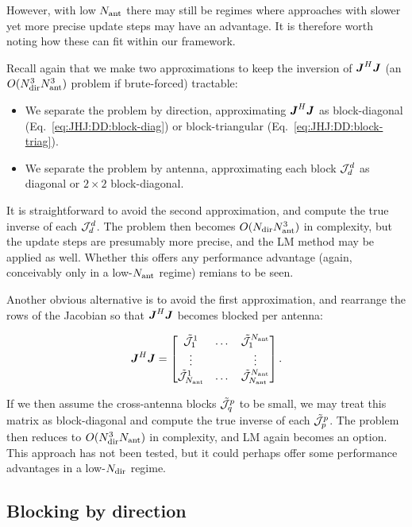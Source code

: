 \documentclass[useAMS,usenatbib]{mn2e}
\newcommand{\mat}[1]{{\bmath{#1}}}
\newcommand{\JJ}{\mat{J}} %
\newcommand{\JHJ}{\JJ^H\JJ} %
\begin{document}
However, with low $N_\mathrm{ant}$ there may still be regimes where approaches with slower yet more precise update steps may have an advantage. 
It is therefore worth noting how these can fit within our framework. 

Recall again that we make two approximations to keep the inversion of $\JHJ$ (an $O(N_\mathrm{dir}^3N_\mathrm{ant}^3)$ problem if brute-forced) tractable:

\begin{itemize}
\item We separate the problem by direction, approximating $\JHJ$ as block-diagonal (Eq.~\ref{eq:JHJ:DD:block-diag}) or block-triangular
(Eq.~\ref{eq:JHJ:DD:block-triag}).
\item We separate the problem by antenna, approximating each block $\mathcal{J}^d_d$ as diagonal or $2\times2$ block-diagonal. 
\end{itemize} 

It is straightforward to avoid the second approximation, and compute the true inverse of each $\mathcal{J}^d_d$. The problem then becomes
$O(N_\mathrm{dir}N_\mathrm{ant}^3)$ in complexity, but the update steps are presumably more precise, and the LM method may be applied as well. Whether
this offers any performance advantage (again, conceivably only in a low-$N_\mathrm{ant}$ regime) remians to be seen.

Another obvious alternative is to avoid the first approximation, and rearrange the rows of the Jacobian so that $\JHJ$ becomes blocked per antenna:

\newcommand{\JJX}{\tilde{\JJJ}}
\begin{equation}
\label{eq:JHJ:DD:blocked-ant}
\JHJ = \Matrix{ccc}{\JJX^1_1 & \dots & \JJX^{\Na}_1 \\
\vdots & & \vdots \\
\JJX_{\Na}^1 & \dots & \JJX_{\Na}^{\Na} }.
\end{equation}

If we then assume the cross-antenna blocks $\JJX^p_q$ to be small, we may treat this matrix as block-diagonal and compute the true inverse of
each $\JJX^p_p$. The problem then reduces to $O(N_\mathrm{dir}^3N_\mathrm{ant})$ in complexity, and LM again becomes an option. This approach has not been 
tested, but it could perhaps offer some performance advantages in a low-$N_\mathrm{dir}$ regime.






\subsection{Blocking by direction}
\end{document}
